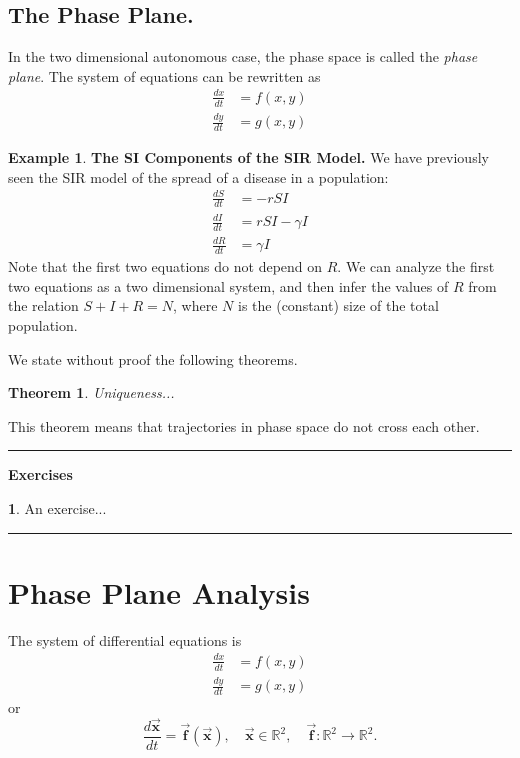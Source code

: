 \documentclass[reqno]{immbook}
\newcommand{\BF}{\vec{\textbf{f}}}
\newcommand{\BX}{\vec{\textbf{x}}}
\numberwithin{equation}{chapter}
\newtheorem{theorem}{Theorem}
\numberwithin{question}{section}
\numberwithin{theorem}{chapter}
\numberwithin{figure}{chapter}
\theoremstyle{definition}
\newtheorem{exercise}{}[section]
\newtheorem{example}{Example}[section]
\newenvironment{exercises}%
{%
\medskip\hrule\medskip\noindent\textbf{Exercises}%
}%
{%
\medskip\hrule
}
\begin{document}
\subsection*{The Phase Plane.}
In the two dimensional autonomous case, the phase space
is called the \emph{phase plane}.
The system of equations can be rewritten as
\begin{equation}
\begin{split}
    \frac{dx}{dt} & = f(x,y) \\
    \frac{dy}{dt} & = g(x,y)
\end{split}
\end{equation}
\begin{example}
\textbf{The SI Components of the SIR Model.}
We have previously seen the SIR model of the spread of
a disease in a population:
\begin{equation}
\begin{split}
   \frac{dS}{dt} & = -rSI \\
   \frac{dI}{dt} & = rSI -\gamma I \\
   \frac{dR}{dt} & = \gamma I
\end{split}
\end{equation}
Note that the first two equations do not depend on $R$.
We can analyze the first two equations as a two dimensional
system, and then infer the values of $R$ from the
relation $S+I+R=N$, where $N$ is the (constant) size
of the total population.
\end{example}

We state without proof the following theorems.
\begin{theorem}
Uniqueness...
\end{theorem}
This theorem means that trajectories in phase
space do not cross each other.

\begin{exercises}
\begin{exercise}
An exercise...
\end{exercise}
\end{exercises}
%
%
\section{Phase Plane Analysis}

The system of differential equations is
\begin{equation}
\begin{split}
   \frac{dx}{dt} & = f(x,y) \\
   \frac{dy}{dt} & = g(x,y)
\end{split}
\end{equation}
or
\begin{equation}
  \frac{d\BX}{dt} = \BF(\BX), \quad \BX \in \mathbb{R}^2, \quad
      \BF : \mathbb{R}^2 \rightarrow \mathbb{R}^2.
\end{equation}
\end{document}

